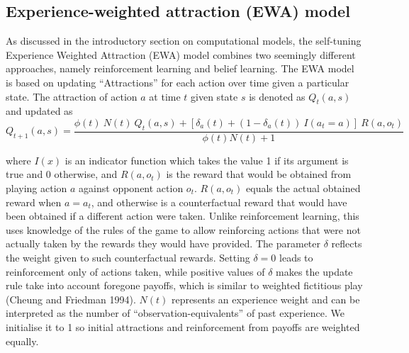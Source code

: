 \documentclass[smallextended]{svjour3}       %
\begin{document}
\hypertarget{experience-weighted-attraction-ewa-model}{%
\subsection{Experience-weighted attraction (EWA)
model}\label{experience-weighted-attraction-ewa-model}}

As discussed in the introductory section on computational models, the
self-tuning Experience Weighted Attraction (EWA) model combines two
seemingly different approaches, namely reinforcement learning and belief
learning. The EWA model is based on updating ``Attractions'' for each
action over time given a particular state. The attraction of action
\(a\) at time \(t\) given state \(s\) is denoted as \(Q_{t}(a, s)\) and
updated as
\[ Q_{t+1}(a,s) =  \frac{\phi(t) \ N(t) \ Q_{t}(a,s) + [ \delta_{a}(t) + (1-\delta_{a}(t)) \ I(a_t = a )] \ R(a,o_t) } {\phi(t)N(t) + 1} \]

where \(I(x)\) is an indicator function which takes the value 1 if its
argument is true and 0 otherwise, and \(R(a,o_t)\) is the reward that
would be obtained from playing action \(a\) against opponent action
\(o_t\). \(R(a,o_t)\) equals the actual obtained reward when
\(a = a_t\), and otherwise is a counterfactual reward that would have
been obtained if a different action were taken. Unlike reinforcement
learning, this uses knowledge of the rules of the game to allow
reinforcing actions that were not actually taken by the rewards they
would have provided. The parameter \(\delta\) reflects the weight given
to such counterfactual rewards. Setting \(\delta = 0\) leads to
reinforcement only of actions taken, while positive values of \(\delta\)
makes the update rule take into account foregone payoffs, which is
similar to weighted fictitious play (Cheung and Friedman 1994). \(N(t)\)
represents an experience weight and can be interpreted as the number of
``observation-equivalents'' of past experience. We initialise it to 1 so
initial attractions and reinforcement from payoffs are weighted equally.
\end{document}
